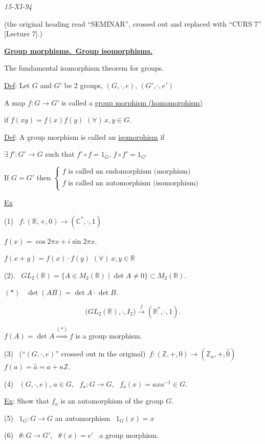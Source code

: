 \documentclass[12pt]{article}
\begin{document}
\begin{center}
\end{center}
\begin{flushright}
\textit{15-XI-94}
\end{flushright}
\noindent \footnotesize (the original heading read ``SEMINAR'', crossed out and replaced with ``CURS 7'' [Lecture 7].)\normalsize

\bigskip
\noindent\underline{\textbf{Group morphisms.\ Group isomorphisms.}}

\noindent The fundamental isomorphism theorem for groups.

\bigskip
\noindent\underline{Def}: Let $G$ and $G'$ be 2 groups, $(G,\cdot,e)$, $(G',\cdot,e')$

\noindent A map $f:G\to G'$ is called a \underline{group morphism (homomorphism)}

\noindent if $f(xy)=f(x)f(y)$ $(\forall)\,x,y\in G$.

\bigskip
\noindent\underline{Def}: A group morphism is called an \underline{isomorphism} if

\noindent $\exists\,f':G'\to G$ such that $f'\circ f=1_G$, $f\circ f'=1_{G'}$

\bigskip
\noindent If $G=G'$ then $\begin{cases} f \text{ is called an } \underline{\text{endomorphism}} \text{ (morphism)} \\ f \text{ is called an } \underline{\text{automorphism}} \text{ (isomorphism)}\end{cases}$

\bigskip
\noindent\underline{Ex}

\noindent (1) \ $f:(\mathbb{R},+,0) \to (\mathbb{C}^*,\cdot,1)$

\noindent $f(x) = \cos 2\pi x + i\sin 2\pi x$.

\noindent $f(x+y) = f(x)\cdot f(y)$ $(\forall)\,x,y\in\mathbb{R}$

\bigskip
\noindent (2). \ $GL_2(\mathbb{R}) = \{A\in M_2(\mathbb{R}) \mid \det A\neq 0\} \subset M_2(\mathbb{R})$.

\noindent $(*)$ \ $\det(AB) = \det A\cdot \det B$.

\[
\big(GL_2(\mathbb{R}),\cdot,I_2\big) \xrightarrow{\ f\ } (\mathbb{R}^*,\cdot,1).
\]

\noindent $f(A) = \det A \overset{(*)}{\Longrightarrow} f$ is a group morphism.

\bigskip
\noindent (3) \ \footnotesize (``$(G,\cdot,e)$'' crossed out in the original)\normalsize \ $f:(\mathbb{Z},+,0) \to (\mathbb{Z}_n,+,\hat 0)$ \quad $f(a)=\hat a = a+n\mathbb{Z}$.

\bigskip
\noindent (4) \ $(G,\cdot,e)$, $a\in G$, \ $f_a:G\to G$, \ $f_a(x)=axa^{-1}\in G$.

\noindent\underline{Ex}: Show that $f_a$ is an automorphism of the group $G$.

\bigskip
\noindent (5) \ $1_G: G\to G$ an automorphism \ $1_G(x)=x$

\bigskip
\noindent (6) \ $\theta:G\to G'$, \ $\theta(x)=e'$ \ a group morphism.
\end{document}

